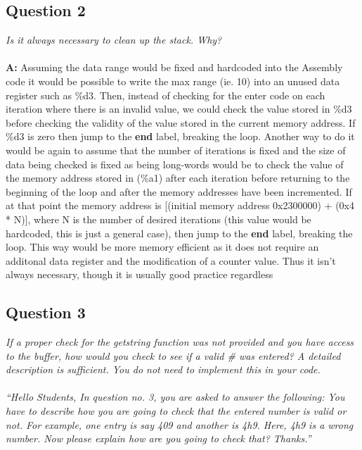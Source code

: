 \documentclass[letterpaper]{article}
\begin{document}
    \subsection{Question 2}
      \textit{Is it always necessary to clean up the stack. Why?}
      \\ \\
      \noindent\textbf{A:}
      Assuming the data range would be fixed and hardcoded into the Assembly code it would be possible to
      write the max range (ie. 10) into an unused data register such as \%d3.  Then, instead of checking
      for the enter code on each iteration where there is an invalid value, we could check the value stored in
      \%d3 before checking the validity of the value stored in the current memory address.  If \%d3 is
      zero then jump to the \textbf{end} label, breaking the loop.  Another way to do it would be again
      to assume that the number of iterations is fixed and the size of data being checked is fixed as being
      long-words would be to check the value of the memory address stored in (\%a1) after each iteration
      before returning to the beginning of the loop and after the memory addresses have been incremented.
      If at that point the memory address is [(initial memory address 0x2300000) + (0x4 * N)], where N is
      the number of desired iterations (this value would be hardcoded, this is just a general case), then
      jump to the \textbf{end} label, breaking the loop.  This way would be more memory efficient as it
      does not require an additonal data register and the modification of a counter value.  Thus it isn't always necessary, though it is usually good practice regardless

      \subsection{Question 3} \textit{If a proper check for the getstring
      function was not provided and you have access to the buffer, how would you
      check to see if a valid \# was entered? A detailed description is
      sufficient. You do not need to implement this in your code.
      \\ \\
      ``Hello Students,
		In question no. 3, you are asked to answer the following:
		You have to describe how you are going to check that the entered number is valid or not.
		For example, one entry is say 409 and another is 4h9. Here, 4h9 is a wrong number. Now please explain how are you going to check that?
		Thanks.''}
	
\end{document}
